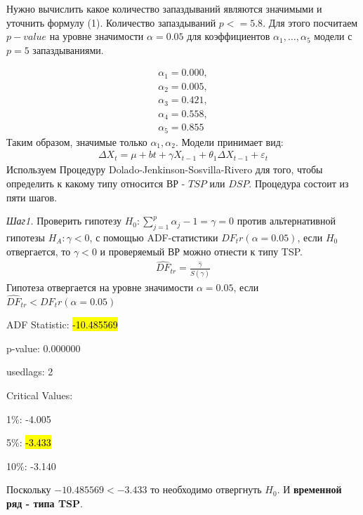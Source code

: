 \documentclass{article}
\begin{document}
Нужно вычислить какое количество запаздываний являются значимыми и уточнить формулу (1). Количество запаздываний $p <= 5.8$. Для этого посчитаем $p-value$ на уровне значимости $\alpha=0.05$ для коэффициентов $\alpha_1,\ldots,\alpha_5$ модели с $p=5$ запаздываниями.

\begin{gather*}
    \alpha_1=0.000,\\
    \alpha_2=0.005,\\
    \alpha_3=0.421,\\
    \alpha_4=0.558,\\
    \alpha_5=0.855
\end{gather*}
Таким образом, значимые только $\alpha_1, \alpha_2$. Модели принимает вид:
\begin{gather}
        \Delta X_t = \mu +bt + \gamma X_{t-1} + \theta_1 \Delta X_{t-1} +\varepsilon_t
\end{gather}
Используем Процедуру Dolado-Jenkinson-Sosvilla-Rivero для того, чтобы определить к какому типу относится ВР - $TSP$ или $DSP$. Процедура состоит из пяти шагов.

\textit{Шаг1.} Проверить гипотезу $H_0: \sum_{j=1}^{p}\alpha_j-1=\gamma = 0$ против альтернативной гипотезы $H_A: \gamma < 0$, с помощью ADF-статистики $DF_tr(\alpha=0.05)$, если $H_0$ отвергается, то $\gamma < 0$ и проверяемый ВР можно отнести к типу TSP. 
\begin{gather*}
    \hat{DF}_{tr} = \frac{\hat{\gamma}}{S(\hat{\gamma})}
\end{gather*}
Гипотеза отвергается на уровне значимости $\alpha=0.05$, если $ \hat{DF}_{tr}<DF_tr(\alpha=0.05)$\newline

ADF Statistic: \hl{-10.485569}

p-value: 0.000000

usedlags: 2

Critical Values:

	1\%: -4.005 
	
	5\%: \hl{-3.433}
	
	10\%: -3.140\newline

Поскольку $-10.485569 <-3.433 $ то необходимо отвергнуть $H_0$. И \textbf{временной ряд - типа TSP}.\newpage
\end{document}
